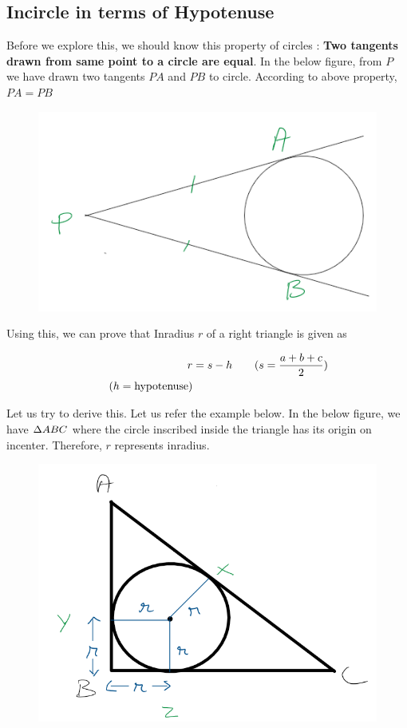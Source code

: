 \newpage

\subsection{Incircle in terms of Hypotenuse}
Before we explore this, we should know this property of circles : \textbf{Two tangents drawn from same point to a circle are equal}. In the below figure, from $P$ we have drawn two tangents $PA$ and $PB$ to circle. According to above property, $PA = PB$

\begin{figure}[h!]
    \centering
    \includegraphics[width=0.4\linewidth]{Quant//Geometry//Images//Triangles/two_tangents_from_same_pt_circle.png}
\end{figure}

Using this, we can prove that Inradius $r$ of a right triangle is given as 

\begin{align*}
    r &= s - h \tag{$ s = \dfrac{a + b + c}{2} $} \\
    \tag{$h = \text{hypotenuse}$}
\end{align*}

Let us try to derive this. Let us refer the example below. In the below figure, we have $\Delta {A}BC$ where the circle inscribed inside the triangle has its origin on incenter. Therefore, $r$ represents inradius.

\begin{figure}[h!]
    \centering
    \includegraphics[width=0.5\linewidth]{Quant//Geometry//Images//Triangles/rt_triangle_inradius_hypo_theory.png}
\end{figure}

